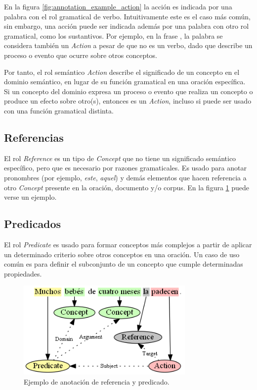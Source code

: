 En la figura \ref{fig:annotation_example_action} la acción es indicada por una palabra con el rol gramatical de verbo. Intuitivamente este es el caso más común, sin embargo, una acción puede ser indicada además por una palabra con otro rol gramatical, como los sustantivos. Por ejemplo, en la frase , la palabra  se considera también un {\it Action} a pesar de que no es un verbo, dado que describe un proceso o evento que ocurre sobre otros conceptos.

Por tanto, el rol semántico {\it Action} describe el significado de un concepto en el dominio semántico, en lugar de su función gramatical en una oración específica. Si un concepto del dominio expresa un proceso o evento que realiza un concepto o produce un efecto sobre otro(s), entonces es un {\it Action}, incluso si puede ser usado con una función gramatical distinta.

\subsection{Referencias}
El rol {\it Reference} es un tipo de {\it Concept} que no tiene un significado semántico específico, pero que es necesario por razones gramaticales. Es usado para anotar pronombres (por ejemplo, {\it este}, {\it aquel}) y demás elementos que hacen referencia a otro {\it Concept} presente en la oración, documento y/o corpus. En la figura \ref{fig:annotation_example_reference_and_predicate} puede verse un ejemplo.

\subsection{Predicados}
El rol {\it Predicate} es usado para formar conceptos más complejos a partir de aplicar un determinado criterio sobre otros conceptos en una oración. Un caso de uso común es para definir el subconjunto de un concepto que cumple determinadas propiedades.

\begin{figure}[H]
	\begin{center}
		\includegraphics[width=3.4in]{graphics/annotation_example_reference_and_predicate.png}
		\caption[Anotación de referencia y predicado]{Ejemplo de anotación de referencia y predicado.}
		\label{fig:annotation_example_reference_and_predicate}
	\end{center}
\end{figure}

